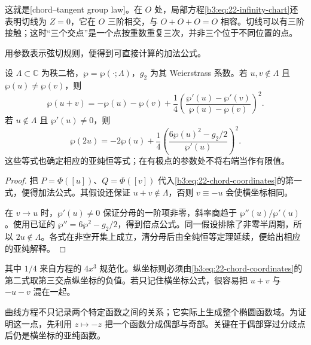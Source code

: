 这就是[chord--tangent group law]。在 \(O\) 处，局部方程\eqref{b3:eq:22-infinity-chart}还表明切线为 \(Z=0\)，它在 \(O\) 三阶相交，与 \(O+O+O=O\) 相容。切线可以有三阶接触；这时“三个交点”是一个点按重数重复三次，并非三个位于不同位置的点。

\ProseParagraphBreak

用参数表示弦切规则，便得到可直接计算的加法公式。

\begin{corollary}[加法与倍点公式]\label{b3:cor:22-addition}
设 \(\Lambda\subset\mathbb C\) 为秩二格，\(\wp=\wp(\cdot;\Lambda)\)，\(g_2\) 为其 Weierstrass 系数。若 \(u,v\notin\Lambda\) 且 \(\wp(u)\ne\wp(v)\)，则
\begin{equation}\label{b3:eq:22-addition}
 \wp(u+v)=-\wp(u)-\wp(v)
 +\frac14\left(\frac{\wp'(u)-\wp'(v)}{\wp(u)-\wp(v)}\right)^2.
\end{equation}
若 \(u\notin\Lambda\) 且 \(\wp'(u)\ne0\)，则
\begin{equation}\label{b3:eq:22-duplication}
 \wp(2u)=-2\wp(u)
 +\frac14\left(\frac{6\wp(u)^2-g_2/2}{\wp'(u)}\right)^2.
\end{equation}
这些等式也确定相应的亚纯恒等式；在有极点的参数处不将右端当作有限值。
\end{corollary}
\begin{proof}
把 \(P=\Phi([u])\)、\(Q=\Phi([v])\) 代入\eqref{b3:eq:22-chord-coordinates}的第一式，便得加法公式。其假设还保证 \(u+v\notin\Lambda\)，否则 \(v\equiv-u\) 会使横坐标相同。

在 \(v\to u\) 时，\(\wp'(u)\ne0\) 保证分母的一阶项非零，斜率商趋于 \(\wp''(u)/\wp'(u)\)。使用已证的 \(\wp''=6\wp^2-g_2/2\)，得到倍点公式。同一假设排除了非零半周期，所以 \(2u\notin\Lambda\)。各式在非空开集上成立，清分母后由全纯恒等定理延续，便给出相应的亚纯解释。
\end{proof}

其中 \(1/4\) 来自方程的 \(4x^3\) 规范化。纵坐标则必须由\eqref{b3:eq:22-chord-coordinates}的第二式取第三交点纵坐标的负值。若只记住横坐标公式，很容易把 \(u+v\) 与 \(-u-v\) 混在一起。

\ProseParagraphBreak

曲线方程不只记录两个特定函数之间的关系；它实际上生成整个椭圆函数域。为证明这一点，先利用 \(z\mapsto-z\) 把一个函数分成偶部与奇部。关键在于偶部穿过分歧点后仍是横坐标的亚纯函数。


